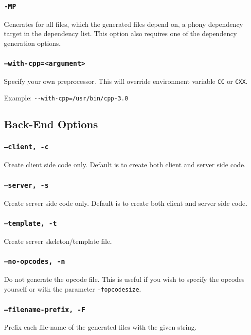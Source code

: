 \subsubsection{{\tt -MP}}
Generates for all files, which the generated files depend on, a phony
dependency target in the dependency list. This option also requires one of the
dependency generation options.

\subsubsection{{\tt --with-cpp=<argument>}}
Specify your own preprocessor. This will override environment
variable \verb|CC| or \verb|CXX|.

Example: \verb|--with-cpp=/usr/bin/cpp-3.0|

\subsection{Back-End Options}

\subsubsection{{\tt --client, -c}}
Create client side code only. Default is to create both client and server side code.

\subsubsection{{\tt --server, -s}}
Create server side code only. Default is to create both client and server side code.

\subsubsection{{\tt --template, -t}}
Create server skeleton/template file.

\subsubsection{{\tt --no-opcodes, -n}}
Do not generate the opcode file. This is useful if you wish to specify the opcodes
yourself or with the parameter {\tt -fopcodesize}.

\subsubsection{{\tt --filename-prefix, -F}}
Prefix each file-name of the \dice{} generated files with the given
string.

